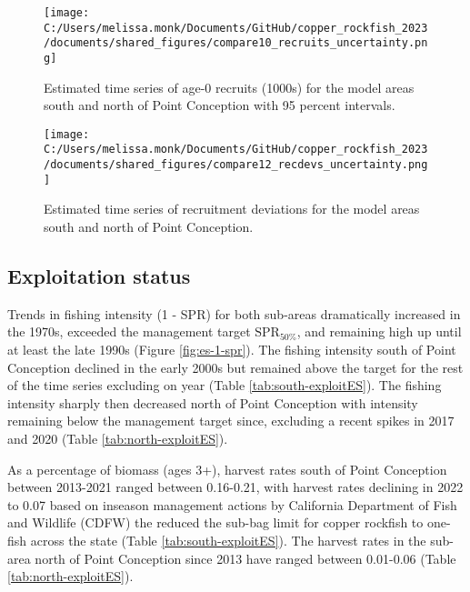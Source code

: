 \documentclass[11pt,
  english,
  letterpaper,
]{article}
\begin{document}


\newpage



\begin{figure}
\centering
\texttt{[image: C:/Users/melissa.monk/Documents/GitHub/copper\_rockfish\_2023/documents/shared\_figures/compare10\_recruits\_uncertainty.png]}
\caption{Estimated time series of age-0 recruits (1000s) for the model areas south and north of Point Conception with 95 percent intervals.\label{fig:es-recruits}}
\end{figure}

\begin{figure}
\centering
\texttt{[image: C:/Users/melissa.monk/Documents/GitHub/copper\_rockfish\_2023/documents/shared\_figures/compare12\_recdevs\_uncertainty.png]}
\caption{Estimated time series of recruitment deviations for the model areas south and north of Point Conception.\label{fig:es-rec-devs}}
\end{figure}

\clearpage

\hypertarget{exploitation-status}{%
\subsection*{Exploitation status}\label{exploitation-status}}

Trends in fishing intensity (1 - SPR) for both sub-areas dramatically increased in the 1970s, exceeded the management target \(\text{SPR}_{50\%}\), and remaining high up until at least the late 1990s (Figure \ref{fig:es-1-spr}). The fishing intensity south of Point Conception declined in the early 2000s but remained above the target for the rest of the time series excluding on year (Table \ref{tab:south-exploitES}). The fishing intensity sharply then decreased north of Point Conception with intensity remaining below the management target since, excluding a recent spikes in 2017 and 2020 (Table \ref{tab:north-exploitES}).

As a percentage of biomass (ages 3+), harvest rates south of Point Conception between 2013-2021 ranged between 0.16-0.21, with harvest rates declining in 2022 to 0.07 based on inseason management actions by California Department of Fish and Wildlife (CDFW) the reduced the sub-bag limit for copper rockfish to one-fish across the state (Table \ref{tab:south-exploitES}). The harvest rates in the sub-area north of Point Conception since 2013 have ranged between 0.01-0.06 (Table \ref{tab:north-exploitES}).
\end{document}

